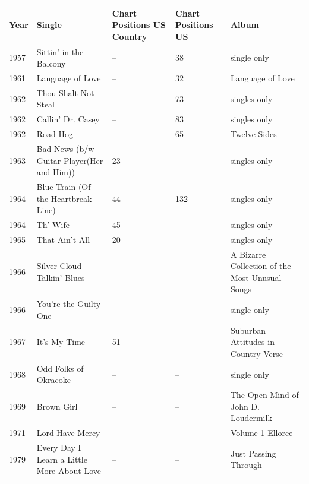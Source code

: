 \documentclass{article}
\begin{document}
\begin{tabular}{lllll}
\toprule
Year & Single & Chart Positions US Country & Chart Positions US & Album \\
\midrule
1957 & Sittin' in the Balcony & -- & 38 & single only \\
1961 & Language of Love & -- & 32 & Language of Love \\
1962 & Thou Shalt Not Steal & -- & 73 & singles only \\
1962 & Callin' Dr. Casey & -- & 83 & singles only \\
1962 & Road Hog & -- & 65 & Twelve Sides \\
1963 & Bad News (b/w Guitar Player(Her and Him)) & 23 & -- & singles only \\
1964 & Blue Train (Of the Heartbreak Line) & 44 & 132 & singles only \\
1964 & Th' Wife & 45 & -- & singles only \\
1965 & That Ain't All & 20 & -- & singles only \\
1966 & Silver Cloud Talkin' Blues & -- & -- & A Bizarre Collection of the Most Unusual Songs \\
1966 & You're the Guilty One & -- & -- & single only \\
1967 & It's My Time & 51 & -- & Suburban Attitudes in Country Verse \\
1968 & Odd Folks of Okracoke & -- & -- & single only \\
1969 & Brown Girl & -- & -- & The Open Mind of John D. Loudermilk \\
1971 & Lord Have Mercy & -- & -- & Volume 1-Elloree \\
1979 & Every Day I Learn a Little More About Love & -- & -- & Just Passing Through \\
\bottomrule
\end{tabular}
\end{document}
